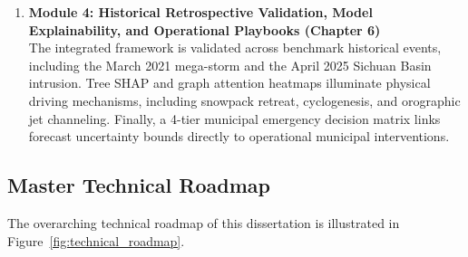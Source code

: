 \begin{enumerate}
    \item \textbf{Module 4: Historical Retrospective Validation, Model Explainability, and Operational Playbooks (Chapter 6)} \\
    The integrated framework is validated across benchmark historical events, including the March 2021 mega-storm and the April 2025 Sichuan Basin intrusion. Tree SHAP and graph attention heatmaps illuminate physical driving mechanisms, including snowpack retreat, cyclogenesis, and orographic jet channeling. Finally, a 4-tier municipal emergency decision matrix links forecast uncertainty bounds directly to operational municipal interventions.
\end{enumerate}

\subsection{Master Technical Roadmap}
\label{subsec:technical_workflow}

The overarching technical roadmap of this dissertation is illustrated in Figure~\ref{fig:technical_roadmap}.

